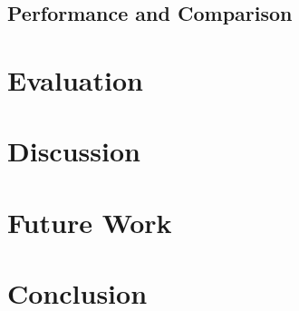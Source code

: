 \documentclass{vldb}
\begin{document}
\subsection{Performance and Comparison}

\section{Evaluation}




\section{Discussion}

\section{Future Work}

\section{Conclusion}



 
\end{document}
